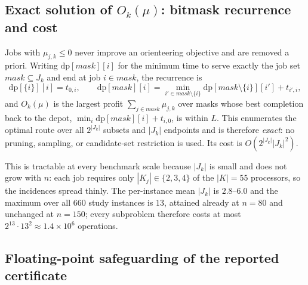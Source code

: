 \documentclass[11pt]{article}
\begin{document}
\subsection{Exact solution of $O_k(\mu)$: bitmask recurrence and cost}

Jobs with $\mu_{j,k}\le 0$ never improve an orienteering objective and are
removed a priori. Writing $\mathrm{dp}[\textit{mask}][i]$ for the minimum time to
serve exactly the job set $\textit{mask}\subseteq J_k$ and end at job $i\in
\textit{mask}$, the recurrence is
\[
\mathrm{dp}[\{i\}][i] = t_{0,i}, \qquad
\mathrm{dp}[\textit{mask}][i] = \min_{i'\in \textit{mask}\setminus\{i\}} \mathrm{dp}[\textit{mask}\setminus\{i\}][i'] + t_{i',i},
\]
and $O_k(\mu)$ is the largest profit $\sum_{j\in\textit{mask}}\mu_{j,k}$ over
masks whose best completion back to the depot, $\min_i \mathrm{dp}[\textit{mask}][i] + t_{i,0}$,
is within $L$. This enumerates the optimal route over all $2^{|J_k|}$ subsets and
$|J_k|$ endpoints and is therefore \emph{exact}: no pruning, sampling, or
candidate-set restriction is used. Its cost is $O(2^{|J_k|}|J_k|^2)$.

This is tractable at every benchmark scale because $|J_k|$ is small and does not
grow with $n$: each job requires only $|K_j|\in\{2,3,4\}$ of the $|K|=55$
processors, so the incidences spread thinly. The per-instance mean $|J_k|$ is
$2.8$--$6.0$ and the maximum over all $660$ study instances is $13$, attained
already at $n=80$ and unchanged at $n=150$; every subproblem therefore costs at
most $2^{13}\cdot 13^2\approx 1.4\times10^6$ operations.

\subsection{Floating-point safeguarding of the reported certificate}
\label{sec:supp-numerical}
\end{document}
